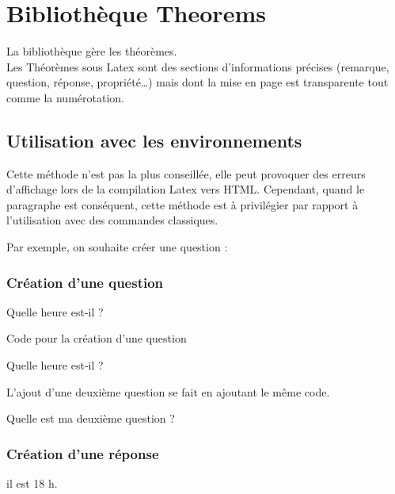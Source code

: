 \chapter {Bibliothèque Theorems}

La bibliothèque  gère les théorèmes.\\

Les Théorèmes sous Latex sont des sections d'informations précises (remarque, question, réponse, propriété\ldots) mais dont la mise en page est transparente tout comme la numérotation.\\


\section{Utilisation avec les environnements}

Cette méthode n'est pas la plus conseillée, elle peut provoquer des erreurs d'affichage lors de la compilation Latex vers HTML.
Cependant, quand le paragraphe est conséquent, cette méthode est à privilégier par rapport à l'utilisation avec des commandes classiques.


Par exemple, on souhaite créer une question : 

\subsection{Création d'une question}

\begin{question}
    Quelle heure est-il ?
\end{question}

\begin{Latex}{Code pour la création d'une question}
\begin{question}
    Quelle heure est-il ?
\end{question}
\end{Latex}

L'ajout d'une deuxième question se fait en ajoutant le même code.

\begin{question}
    Quelle est ma deuxième question ?
\end{question}


\subsection{Création d'une réponse}

\begin{reponse}
    il est 18 h.
\end{reponse}

